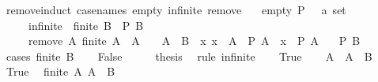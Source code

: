 \begin{isabellebody}
\isamarkupfalse%
%
\endisatagproof
{\isafoldproof}%
%
\isadelimproof
\isanewline
%
\endisadelimproof
\isanewline
{}\isamarkupfalse%
\ remove{\isacharunderscore}{\kern0pt}induct\ {\isacharbrackleft}{\kern0pt}case{\isacharunderscore}{\kern0pt}names\ empty\ infinite\ remove{\isacharbrackright}{\kern0pt}{\isacharcolon}{\kern0pt}\isanewline
\ \ \ empty{\isacharcolon}{\kern0pt}\ {\isachardoublequoteopen}P\ {\isacharparenleft}{\kern0pt}{\isacharbraceleft}{\kern0pt}{\isacharbraceright}{\kern0pt}\ {\isacharcolon}{\kern0pt}{\isacharcolon}{\kern0pt}\ {\isacharprime}{\kern0pt}a\ set{\isacharparenright}{\kern0pt}{\isachardoublequoteclose}\isanewline
\ \ \ \ \ infinite{\isacharcolon}{\kern0pt}\ {\isachardoublequoteopen}{\isasymnot}\ finite\ B\ {\isasymLongrightarrow}\ P\ B{\isachardoublequoteclose}\isanewline
\ \ \ \ \ remove{\isacharcolon}{\kern0pt}\ {\isachardoublequoteopen}{\isasymAnd}A{\isachardot}{\kern0pt}\ finite\ A\ {\isasymLongrightarrow}\ A\ {\isasymnoteq}\ {\isacharbraceleft}{\kern0pt}{\isacharbraceright}{\kern0pt}\ {\isasymLongrightarrow}\ A\ {\isasymsubseteq}\ B\ {\isasymLongrightarrow}\ {\isacharparenleft}{\kern0pt}{\isasymAnd}x{\isachardot}{\kern0pt}\ x\ {\isasymin}\ A\ {\isasymLongrightarrow}\ P\ {\isacharparenleft}{\kern0pt}A\ {\isacharminus}{\kern0pt}\ {\isacharbraceleft}{\kern0pt}x{\isacharbraceright}{\kern0pt}{\isacharparenright}{\kern0pt}{\isacharparenright}{\kern0pt}\ {\isasymLongrightarrow}\ P\ A{\isachardoublequoteclose}\isanewline
\ \ \ {\isachardoublequoteopen}P\ B{\isachardoublequoteclose}\isanewline
%
\isadelimproof
%
\endisadelimproof
%
\isatagproof
{}\isamarkupfalse%
\ {\isacharparenleft}{\kern0pt}cases\ {\isachardoublequoteopen}finite\ B{\isachardoublequoteclose}{\isacharparenright}{\kern0pt}\isanewline
\ \ \isamarkupfalse%
\ False\isanewline
\ \ \isamarkupfalse%
\ \isamarkupfalse%
\ {\isacharquery}{\kern0pt}thesis\ \isamarkupfalse%
\ {\isacharparenleft}{\kern0pt}rule\ infinite{\isacharparenright}{\kern0pt}\isanewline
{}\isamarkupfalse%
\isanewline
\ \ \isamarkupfalse%
\ True\isanewline
\ \ \isamarkupfalse%
\ A\ \ {\isachardoublequoteopen}A\ {\isacharequal}{\kern0pt}\ B{\isachardoublequoteclose}\isanewline
\ \ \isamarkupfalse%
\ True\ \isamarkupfalse%
\ {\isachardoublequoteopen}finite\ A{\isachardoublequoteclose}\ {\isachardoublequoteopen}A\ {\isasymsubseteq}\ B{\isachardoublequoteclose}\isanewline

\end{isabellebody}
